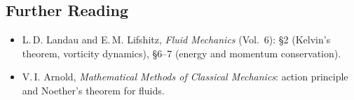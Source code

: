 \documentclass[../main.tex]{subfiles}
\begin{document}
\subsection*{Further Reading}
\begin{itemize}
  \item L.\,D. Landau and E.\,M. Lifshitz, \textit{Fluid Mechanics} (Vol.\ 6):
    \S2 (Kelvin's theorem, vorticity dynamics), \S6--7 (energy and momentum conservation).
  \item V.\,I. Arnold, \textit{Mathematical Methods of Classical Mechanics}: action principle and Noether's theorem for fluids.
\end{itemize}
\end{document}
